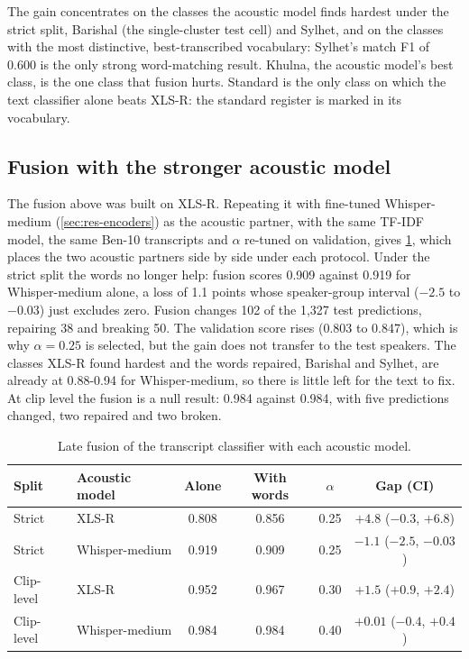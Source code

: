 The gain concentrates on the classes the acoustic model finds hardest under the
strict split, Barishal (the single-cluster test cell) and Sylhet, and on the
classes with the most distinctive, best-transcribed vocabulary: Sylhet's match
F1 of 0.600 is the only strong word-matching result. Khulna, the acoustic
model's best class, is the one class that fusion hurts. Standard is the only
class on which the text classifier alone beats XLS-R: the standard register is
marked in its vocabulary.

\subsection{Fusion with the stronger acoustic model}
\label{sec:res-fusion-wm}

The fusion above was built on XLS-R. Repeating it with fine-tuned
Whisper-medium (\cref{sec:res-encoders}) as the acoustic partner, with the
same TF-IDF model, the same Ben-10 transcripts and $\alpha$ re-tuned on
validation, gives \cref{tab:fusion-wm}, which places the two acoustic partners
side by side under each protocol. Under the strict split the words no longer
help: fusion scores 0.909 against 0.919 for Whisper-medium alone, a loss of 1.1
points whose speaker-group interval ($-2.5$ to $-0.03$) just excludes zero.
Fusion changes 102 of the 1,327 test predictions, repairing 38 and breaking 50.
The validation score rises (0.803 to 0.847), which is why $\alpha = 0.25$ is
selected, but the gain does not transfer to the test speakers. The classes
XLS-R found hardest and the words repaired, Barishal and Sylhet, are already at
0.88-0.94 for Whisper-medium, so there is little left for the text to fix. At
clip level the fusion is a null result: 0.984 against 0.984, with five
predictions changed, two repaired and two broken.

\begin{table}[ht]
  \centering
  \caption{Late fusion of the transcript classifier with each acoustic model.}
  \label{tab:fusion-wm}
  \small
  \begin{tabular}{llcccc}
    \toprule
    Split & Acoustic model & Alone & With words & $\alpha$ & Gap (CI) \\
    \midrule
    Strict     & XLS-R          & 0.808 & 0.856 & 0.25 & $+4.8$ ($-0.3$, $+6.8$) \\
    Strict     & Whisper-medium & 0.919 & 0.909 & 0.25 & $-1.1$ ($-2.5$, $-0.03$) \\
    Clip-level & XLS-R          & 0.952 & 0.967 & 0.30 & $+1.5$ ($+0.9$, $+2.4$) \\
    Clip-level & Whisper-medium & 0.984 & 0.984 & 0.40 & $+0.01$ ($-0.4$, $+0.4$) \\
    \bottomrule
  \end{tabular}
\end{table}

